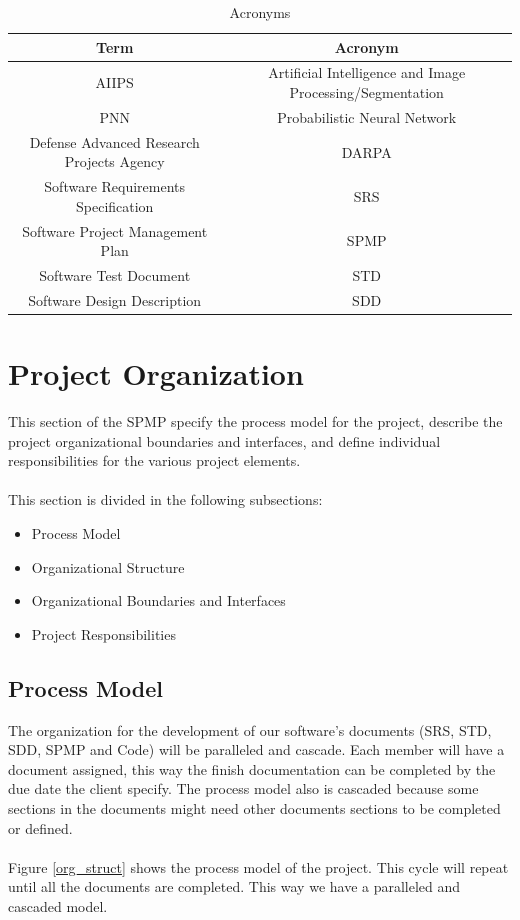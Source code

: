 \documentclass[12pt]{article}
\begin{document}
\begin{table}[H]\centering
\begin{tabular}{|c|c|}
  \hline
  Term & Acronym \\
   \hline
   AIIPS & Artificial Intelligence and Image Processing/Segmentation   \\
    \hline
    PNN & Probabilistic Neural Network \\
    \hline
  Defense Advanced Research Projects Agency  & DARPA \\
   \hline
  Software Requirements Specification & SRS \\
   \hline
    Software Project Management Plan & SPMP \\
   \hline
     Software Test Document & STD \\
   \hline
     Software Design Description & SDD \\
   \hline
\end{tabular}
\caption{Acronyms}
\end{table}

\section{Project Organization}
This section of the SPMP specify the process model for the project, describe the project organizational boundaries and interfaces, and define individual responsibilities for the various project elements.\\\\
This section is divided in the following subsections:
\begin{itemize}
  \item Process Model
  \item Organizational Structure
  \item Organizational Boundaries and Interfaces
  \item Project Responsibilities
\end{itemize}

\subsection{Process Model}
The organization for the development of our software's documents (SRS, STD, SDD, SPMP and Code) will be paralleled and cascade. Each member will have a document assigned, this way the finish documentation can be completed by the due date the client specify. The process model also is cascaded because some sections in the documents might need other documents sections to be completed or defined.\\\\
Figure \ref{org_struct} shows the process model of the project. This cycle will repeat until all the documents are completed. This way we have a paralleled and cascaded model.
\end{document}
